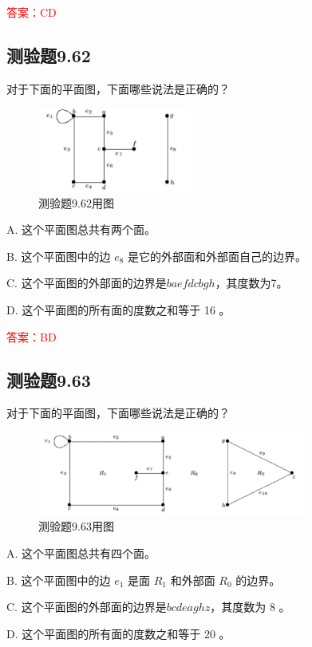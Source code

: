 \documentclass[UTF8, heading=true]{ctexart}
\begin{document}
\textcolor{red}{答案：CD}

\subsection{测验题9.62}

对于下面的平面图，下面哪些说法是正确的？

\begin{figure}[H]
  \centering
  \includegraphics[width=0.45\textwidth]{9.62.jpg} %
  \caption{测验题9.62用图}
\end{figure}

A. 这个平面图总共有两个面。

B. 这个平面图中的边 $e_8$ 是它的外部面和外部面自己的边界。

C. 这个平面图的外部面的边界是$baefdcbgh$，其度数为7。

D. 这个平面图的所有面的度数之和等于 16 。

\textcolor{red}{答案：BD}

\subsection{测验题9.63}

对于下面的平面图，下面哪些说法是正确的？

\begin{figure}[H]
  \centering
  \includegraphics[width=0.79\textwidth]{9.63.jpg} %
  \caption{测验题9.63用图}
\end{figure}

A. 这个平面图总共有四个面。

B. 这个平面图中的边 $e_1$ 是面 $R_1$ 和外部面 $R_0$ 的边界。

C. 这个平面图的外部面的边界是$bcdeaghz$，其度数为 8 。

D. 这个平面图的所有面的度数之和等于 20 。
\end{document}
